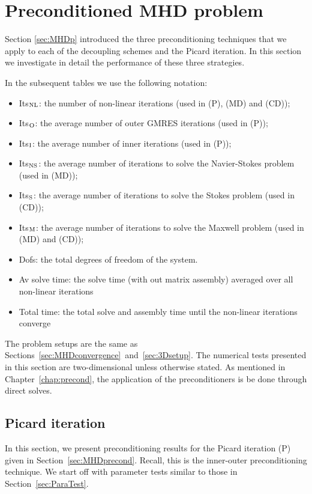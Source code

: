 \section{Preconditioned MHD problem}



Section \ref{sec:MHDp}  introduced the three preconditioning techniques that we apply to each of the decoupling schemes and the Picard iteration. In this section we investigate in detail the performance of these three strategies.

In the subsequent tables we use the following notation:
\begin{itemize}
 \item Its$_{\rm NL}$: the number of non-linear iterations (used in (P), (MD) and (CD));
 \item Its$_{\rm O}$: the average number of outer GMRES iterations (used in (P));
 \item Its$_{\rm I}$: the average number of inner iterations (used in (P));
 \item Its$_{\rm NS}$: the average number of iterations to solve the Navier-Stokes problem (used in (MD));
 \item Its$_{\rm S}$: the average number of iterations to solve the Stokes problem (used in (CD));
 \item Its$_{\rm M}$: the average number of iterations to solve the Maxwell problem (used in (MD) and (CD));
 \item Dofs: the total degrees of freedom of the system.
 \item Av solve time: the solve time (with out matrix assembly) averaged over all non-linear iterations
 \item Total time: the total solve and assembly time until the non-linear iterations converge
\end{itemize}
The  problem setups are the same as Sections~\ref{sec:MHDconvergence}~and~\ref{sec:3Dsetup}. The numerical tests presented in this section are two-dimensional unless otherwise stated.  As mentioned in Chapter~\ref{chap:precond}, the application of the preconditioners is be done through direct solves.


\subsection{Picard iteration}

In this section, we present preconditioning results for the  Picard iteration (P) given in Section~\ref{sec:MHDprecond}. Recall, this is the inner-outer preconditioning technique. 
We start off with parameter tests similar to those in Section~\ref{sec:ParaTest}.

